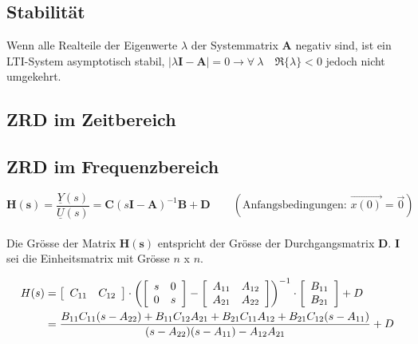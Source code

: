 \subsection{Stabilität }
  Wenn alle Realteile der Eigenwerte $\lambda$ der Systemmatrix ${\boldsymbol A}$
  negativ sind, ist ein LTI-System asymptotisch stabil, \newline
  $\left | \lambda\boldsymbol{I} - \boldsymbol{A} \right |   =0 \rightarrow \forall~\lambda \quad\Re \{\lambda\}<0$
  jedoch nicht umgekehrt. 

\subsection{ZRD im Zeitbereich }

\subsection{ZRD im Frequenzbereich  }
  \[ \boldsymbol{H(s)} = \frac{\underline{Y}(s)}{\underline{U}(s)} =
  \boldsymbol{C}\left(s\boldsymbol{I}-\boldsymbol{A}\right)^{-1}\boldsymbol{B}+\boldsymbol{D} \qquad
   (\text{Anfangsbedingungen: } \vec{x(0)} = \vec 0) \]
  \\
  Die Grösse der Matrix $\boldsymbol {H(s)}$ entspricht der Grösse der
  Durchgangsmatrix $\boldsymbol D$. $\boldsymbol{I}$ sei die Einheitsmatrix mit
  Grösse $n$ x $n$.
  
  \begin{align*}
    H(s) &= \left[
    \begin{array}{c c}
      C_{11}  & C_{12}\\
    \end{array}
    \right] \cdot \left( \left[
    \begin{array}{cc}
      s & 0\\
      0 & s\\
    \end{array}
    \right] - \left[
    \begin{array}{cc}
      A_{11} & A_{12}\\
      A_{21} & A_{22}\\
    \end{array}
    \right] \right)^{-1} \cdot \left[
    \begin{array}{c}
      B_{11}\\
      B_{21}\\
    \end{array}
    \right ]+ D \\
    &=  \frac{B_{11}C_{11}(s-A_{22}) + B_{11}C_{12}A_{21} + B_{21}C_{11}A_{12} + B_{21}C_{12}(s-A_{11})}
		{(s-A_{22})(s-A_{11}) - A_{12}A_{21}} + D
  \end{align*}

